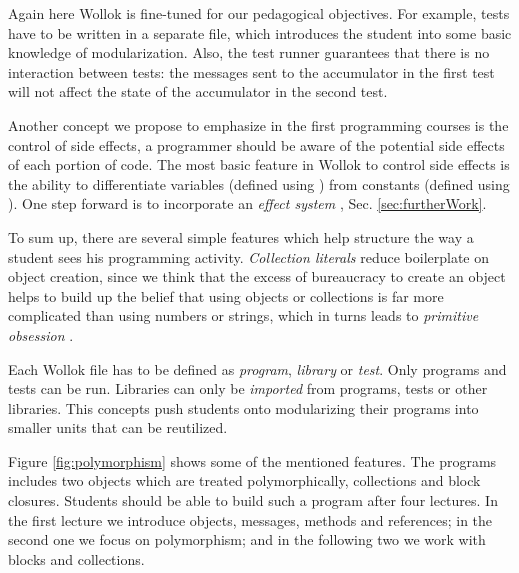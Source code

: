 Again here Wollok is fine-tuned for our pedagogical objectives.
For example, tests have to be written in a separate file, which introduces the student into some basic knowledge of modularization.
Also, the test runner guarantees that there is no interaction between tests: the messages sent to the accumulator in the first test will not affect the state of the accumulator in the second test.

\bigskip 
Another concept we propose to emphasize in the first programming courses is the control of side effects, 
\ie a programmer should be aware of the potential side effects of each portion of code.
The most basic feature in Wollok to control side effects is the ability to 
differentiate variables (defined using )
from constants (defined using ).
One step forward is to incorporate an \emph{effect system} \cite{nielson_type_1999}, \cf Sec. \ref{sec:furtherWork}.

\medskip
To sum up, there are several simple features which help structure the way a student sees his programming activity.
\emph{Collection literals} reduce boilerplate on object creation, 
since we think that the excess of bureaucracy to create an object helps to build up 
the belief that using objects or collections is far more complicated than using numbers or strings, which in turns leads to \emph{primitive obsession} \cite{fowler_refactoring:_1999}.

Each Wollok file has to be defined as \emph{program}, \emph{library} or \emph{test}.
Only programs and tests can be run. Libraries can only be \emph{imported} from programs, tests or other libraries.
This concepts push students onto modularizing their programs into smaller units that can be reutilized.

Figure \ref{fig:polymorphism} shows some of the mentioned features.
The programs includes two objects which are treated polymorphically, collections and block closures.
Students should be able to build such a program after four lectures.
In the first lecture we introduce objects, messages, methods and references;
in the second one we focus on polymorphism;
and in the following two we work with blocks and collections.

